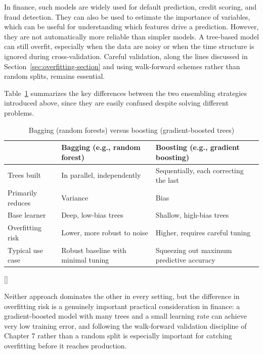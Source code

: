 \documentclass[../ai_in_finance]{subfiles}
\begin{document}
In finance, such models are widely used for default prediction, credit scoring, and fraud detection. They can also be used to estimate the importance of variables, which can be useful for understanding which features drive a prediction. However, they are not automatically more reliable than simpler models. A tree-based model can still overfit, especially when the data are noisy or when the time structure is ignored during cross-validation. Careful validation, along the lines discussed in Section~\ref{sec:overfitting-section} and using walk-forward schemes rather than random splits, remains essential.

Table~\ref{tab:bagging_vs_boosting} summarizes the key differences between the two ensembling strategies introduced above, since they are easily confused despite solving different problems.

\begin{table}[htbp]
\centering
\begin{lrbox}{\bookmeasuredbox}
\begin{tabular}{p{2.8cm}p{5.0cm}p{5.0cm}}
\toprule
 & Bagging (e.g., random forest) & Boosting (e.g., gradient boosting\index{gradient boosting}) \\
\midrule
Trees built & In parallel, independently & Sequentially, each correcting the last \\
Primarily reduces & Variance & Bias \\
Base learner & Deep, low-bias trees & Shallow, high-bias trees \\
Overfitting risk & Lower, more robust to noise & Higher, requires careful tuning \\
Typical use case & Robust baseline with minimal tuning & Squeezing out maximum predictive accuracy \\
\bottomrule
\end{tabular}
\end{lrbox}
\ifdim\wd\bookmeasuredbox<0.65\linewidth
\setlength{\bookcapwidth}{0.65\linewidth}
\else
\setlength{\bookcapwidth}{\wd\bookmeasuredbox}
\fi
{}[\bookcapwidth]{
\usebox{\bookmeasuredbox}
}{
\caption{Bagging (random forests) versus boosting (gradient-boosted trees)}
\label{tab:bagging_vs_boosting}
}
\end{table}

Neither approach dominates the other in every setting, but the difference in overfitting risk is a genuinely important practical consideration in finance: a gradient-boosted model with many trees and a small learning rate can achieve very low training error, and following the walk-forward validation discipline of Chapter 7 rather than a random split is especially important for catching overfitting before it reaches production.
\end{document}
